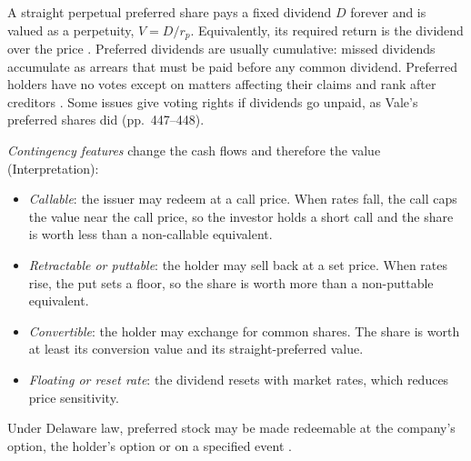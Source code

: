 \begin{qfmethod}\label{meth:preferred-stock-valuation}
 A straight perpetual preferred share pays a fixed dividend $D$ forever and is valued as a perpetuity, $V=D/r_p$. Equivalently, its required return is the dividend over the price \citep[p.~144]{applied-corporate-finance-2014}. Preferred dividends are usually cumulative: missed dividends accumulate as arrears that must be paid before any common dividend. Preferred holders have no votes except on matters affecting their claims and rank after creditors \citep[p.~291]{applied-corporate-finance-2014}. Some issues give voting rights if dividends go unpaid, as Vale's preferred shares did (pp.~447--448).

\emph{Contingency features} change the cash flows and therefore the value (Interpretation):
\begin{itemize}
\item \emph{Callable}: the issuer may redeem at a call price. When rates fall, the call caps the value near the call price, so the investor holds a short call and the share is worth less than a non-callable equivalent.
\item \emph{Retractable or puttable}: the holder may sell back at a set price. When rates rise, the put sets a floor, so the share is worth more than a non-puttable equivalent.
\item \emph{Convertible}: the holder may exchange for common shares. The share is worth at least its conversion value and its straight-preferred value.
\item \emph{Floating or reset rate}: the dividend resets with market rates, which reduces price sensitivity.
\end{itemize}
Under Delaware law, preferred stock may be made redeemable at the company's option, the holder's option or on a specified event \citep[sec.~151(b)]{delaware-gcl-2026}.


\end{qfmethod}
